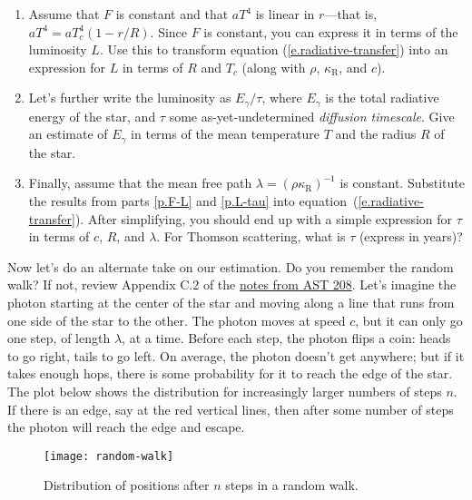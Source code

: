 \begin{exercisebox}
\begin{enumerate}
\item\label{p.F-L}
Assume that $F$ is constant and that $aT^{4}$ is linear in $r$---that is, $aT^{4} = aT_{c}^{4}(1-r/R)$.  Since $F$ is constant, you can express it in terms of the luminosity $L$.  Use this to transform equation (\ref{e.radiative-transfer}) into an expression for $L$ in terms of $R$ and $T_{c}$ (along with $\rho$, $\kappa_{\mathrm{R}}$, and $c$).

\item\label{p.L-tau}
Let's further write the luminosity as $E_{\gamma}/\tau$, where $E_{\gamma}$ is the total radiative energy of the star, and $\tau$ some as-yet-undetermined \emph{diffusion timescale}.  Give an estimate of $E_{\gamma}$ in terms of the mean temperature $T$ and the radius $R$ of the star.

\item
Finally, assume that the mean free path $\lambda = (\rho\kappa_{\mathrm{R}})^{-1}$ is constant.  Substitute the results from parts \ref{p.F-L} and \ref{p.L-tau} into equation~(\ref{e.radiative-transfer}).  After simplifying, you should end up with a simple expression for $\tau$ in terms of $c$, $R$, and $\lambda$.  For Thomson scattering, what is $\tau$ (express in years)?
\end{enumerate}
\end{exercisebox}

Now let's do an alternate take on our estimation. Do you remember the random walk? If not, review Appendix C.2 of the \href{http://www.pa.msu.edu/~ebrown/docs/AST208-notes.pdf}{notes from AST 208}. Let's imagine the photon starting at the center of the star and moving along a line that runs from one side of the star to the other.  The photon moves at speed $c$, but it can only go one step, of length $\lambda$, at a time. Before each step, the photon flips a coin: heads to go right, tails to go left. On average, the photon doesn't get anywhere; but if it takes enough hops, there is some probability for it to reach the edge of the star. The plot below shows the distribution for increasingly larger numbers of steps $n$. If there is an edge, say at the red vertical lines, then after some number of steps the photon will reach the edge and escape.

\begin{figure}[htbp]
\texttt{[image: random-walk]}
\caption{\label{f.random-walk} Distribution of positions after $n$ steps in a random walk.}
\end{figure}

